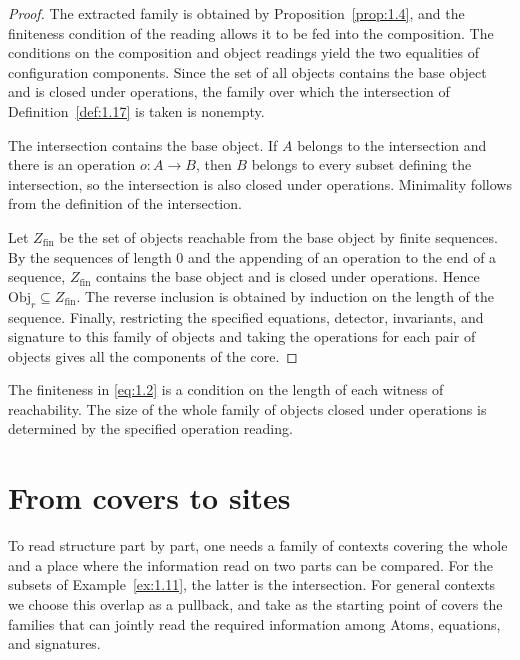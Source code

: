 \begin{proof}

The extracted family is obtained by Proposition~\ref{prop:1.4}, and the
finiteness condition of the reading allows it to be fed into the composition.
The conditions on the composition and object readings yield the two equalities
of configuration components.
Since the set of all objects contains the base object and is closed under
operations, the family over which the intersection of
Definition~\ref{def:1.17} is taken is nonempty.

The intersection contains the base object. If $A$ belongs to the intersection
and there is an operation $o:A\to B$, then $B$ belongs to every subset defining
the intersection, so the intersection is also closed under operations.
Minimality follows from the definition of the intersection.

Let $Z_{\mathrm{fin}}$ be the set of objects reachable from the base object by
finite sequences.
By the sequences of length $0$ and the appending of an operation to the end of a
sequence, $Z_{\mathrm{fin}}$ contains the base object and is closed under
operations.
Hence $\mathrm{Obj}_r\subseteq Z_{\mathrm{fin}}$.
The reverse inclusion is obtained by induction on the length of the sequence.
Finally, restricting the specified equations, detector, invariants, and
signature to this family of objects and taking the operations for each pair of
objects gives all the components of the core.

\end{proof}

The finiteness in \eqref{eq:1.2} is a condition on the length of each witness of
reachability.
The size of the whole family of objects closed under operations is determined by
the specified operation reading.

\section{From covers to sites}\label{sec:1.5}

To read structure part by part, one needs a family of contexts covering the
whole and a place where the information read on two parts can be compared.
For the subsets of Example~\ref{ex:1.11}, the latter is the intersection.
For general contexts we choose this overlap as a pullback, and take as the
starting point of covers the families that can jointly read the required
information among Atoms, equations, and signatures.

